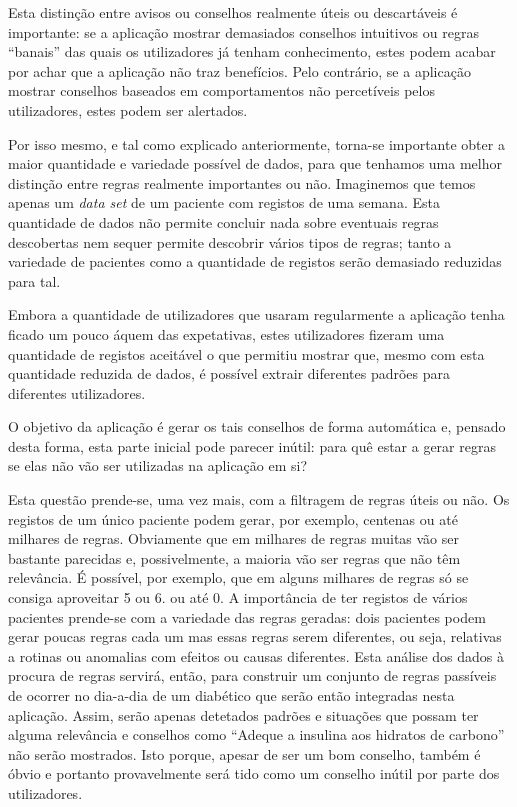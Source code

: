 Esta distinção entre avisos ou conselhos realmente úteis ou descartáveis é importante: se a aplicação mostrar demasiados conselhos intuitivos ou regras ``banais'' das quais os utilizadores já tenham conhecimento, estes podem acabar por achar que a aplicação não traz benefícios. Pelo contrário, se a aplicação mostrar conselhos baseados em comportamentos não percetíveis pelos utilizadores, estes podem ser alertados. 

Por isso mesmo, e tal como explicado anteriormente, torna-se importante obter a maior quantidade e variedade possível de dados, para que tenhamos uma melhor distinção entre regras realmente importantes ou não. Imaginemos que temos apenas um \textit{data set} de um paciente com registos de uma semana. Esta quantidade de dados não permite concluir nada sobre eventuais regras descobertas nem sequer permite descobrir vários tipos de regras; tanto a variedade de pacientes como a quantidade de registos serão demasiado reduzidas para tal. 

Embora a quantidade de utilizadores que usaram regularmente a aplicação tenha ficado um pouco áquem das expetativas, estes utilizadores fizeram uma quantidade de registos aceitável o que permitiu mostrar que, mesmo com esta quantidade reduzida de dados, é possível extrair diferentes padrões para diferentes utilizadores.

O objetivo da aplicação é gerar os tais conselhos de forma automática e, pensado desta forma, esta parte inicial pode parecer inútil: para quê estar a gerar regras se elas não vão ser utilizadas na aplicação em si? 

Esta questão prende-se, uma vez mais, com a filtragem de regras úteis ou não. Os registos de um único paciente podem gerar, por exemplo, centenas ou até milhares de regras. Obviamente que em milhares de regras muitas vão ser bastante parecidas e, possivelmente, a maioria vão ser regras que não têm relevância. É possível, por exemplo, que em alguns milhares de regras só se consiga aproveitar 5 ou 6. ou até 0. A importância de ter registos de vários pacientes prende-se com a variedade das regras geradas: dois pacientes podem gerar poucas regras cada um mas essas regras serem diferentes, ou seja, relativas a rotinas ou anomalias com efeitos ou causas diferentes. Esta análise dos dados à procura de regras servirá, então, para construir um conjunto de regras passíveis de ocorrer no dia-a-dia de um diabético que serão então integradas nesta aplicação. Assim, serão apenas detetados padrões e situações que possam ter alguma relevância e conselhos como ``Adeque a insulina aos hidratos de carbono'' não serão mostrados. Isto porque, apesar de ser um bom conselho, também é óbvio e portanto provavelmente será tido como um conselho inútil por parte dos utilizadores. 


